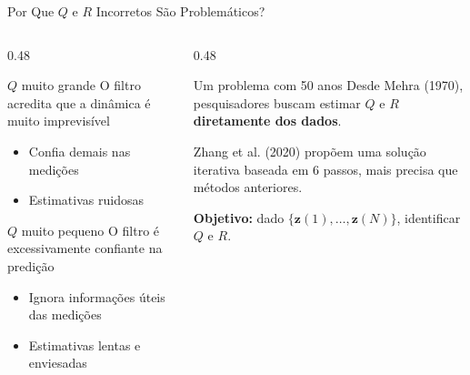 \documentclass[aspectratio=169]{beamer}
\begin{document}
\begin{frame}{Por Que $Q$ e $R$ Incorretos São Problemáticos?}
    \begin{columns}[T]
        \begin{column}{0.48\textwidth}
            \begin{block}{$Q$ muito grande}
                O filtro acredita que a dinâmica é muito imprevisível
                \begin{itemize}
                    \item Confia demais nas medições
                    \item Estimativas ruidosas
                \end{itemize}
            \end{block}
            \vspace{0.2cm}
            \begin{block}{$Q$ muito pequeno}
                O filtro é excessivamente confiante na predição
                \begin{itemize}
                    \item Ignora informações úteis das medições
                    \item Estimativas lentas e enviesadas
                \end{itemize}
            \end{block}
        \end{column}
        \begin{column}{0.48\textwidth}
            \begin{alertblock}{Um problema com 50 anos}
                Desde Mehra (1970), pesquisadores buscam estimar
                $Q$ e $R$ \textbf{diretamente dos dados}.

                \vspace{0.3cm}
                Zhang et al. (2020) propõem uma solução iterativa
                baseada em 6 passos, mais precisa que métodos anteriores.
            \end{alertblock}
            \vspace{0.2cm}
            \textbf{Objetivo:} dado $\{\mathbf{z}(1),\ldots,\mathbf{z}(N)\}$,
            identificar $Q$ e $R$.
        \end{column}
    \end{columns}
\end{frame}
\end{document}
